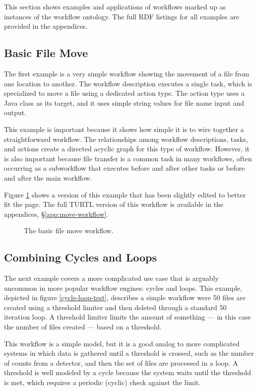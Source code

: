This section shows examples and applications of workflows marked up as
instances of the workflow ontology. The full RDF listings for all
examples are provided in the appendices.

\subsection{Basic File Move}
\label{move-workflow}

The first example is a very simple workflow showing the movement of a file from
one location to another. The workflow description executes a single task, which
is specialized to move a file using a dedicated action type. The action type
uses a Java class as its target, and it uses simple string values for file name
input and output.

This example is important because it shows how simple it is to wire together a
straightforward workflow. The relationships among workflow descriptions,
tasks, and actions create a directed acyclic graph for this type of workflow.
However, it is also important because file transfer is a common task in many
workflows, often occurring as a subworkflow that executes before and after
other tasks or before and after the main workflow.

Figure \ref{move-workflows} shows a version of this example that has been
slightly edited to better fit the page. The full TURTL version of this workflow
is available in the appendices, \S \ref{app:move-workflow}.

\begin{figure}[htbp]
\centering
{}
\caption{The basic file move workflow.}
\label{move-workflows}
\end{figure}

\subsection{Combining Cycles and Loops}

The next example covers a more complicated use case that is arguably uncommon
in more popular workflow engines: cycles and loops. This example, depicted in
figure \ref{cycle-loop-test}, describes a simple workflow were 50 files are
created using a threshold limiter and then deleted through a standard
50 iteration loop. A threshold limiter limits the amount of something --- in
this case the number of files created --- based on a threshold.

This workflow is a simple model, but it is a good analog to more complicated
systems in which data is gathered until a threshold is crossed, such as
the number of counts from a detector, and then the set of files are processed in a loop. A
threshold is well modeled by a cycle because the system waits until the
threshold is met, which requires a periodic (cyclic) check against the limit.

